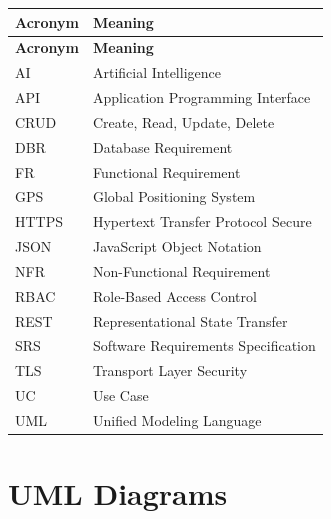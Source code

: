 \begin{longtable}{|p{3cm}|p{11cm}|}

\hline
\textbf{Acronym} &
\textbf{Meaning} \\
\hline
\endfirsthead

\hline
\textbf{Acronym} &
\textbf{Meaning} \\
\hline
\endhead

AI &
Artificial Intelligence \\
\hline

API &
Application Programming Interface \\
\hline

CRUD &
Create, Read, Update, Delete \\
\hline

DBR &
Database Requirement \\
\hline

FR &
Functional Requirement \\
\hline

GPS &
Global Positioning System \\
\hline

HTTPS &
Hypertext Transfer Protocol Secure \\
\hline

JSON &
JavaScript Object Notation \\
\hline

NFR &
Non-Functional Requirement \\
\hline

RBAC &
Role-Based Access Control \\
\hline

REST &
Representational State Transfer \\
\hline

SRS &
Software Requirements Specification \\
\hline

TLS &
Transport Layer Security \\
\hline

UC &
Use Case \\
\hline

UML &
Unified Modeling Language \\
\hline

\end{longtable}

\section{UML Diagrams}
\label{sec:uml-diagrams}


